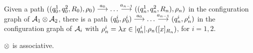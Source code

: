 \begin{corollary}
Given a path $((q_0^1,q_0^2,R_0),\rho_0) \overset{a_0}{\longrightarrow} \dots \overset{a_{n-1}}{\longrightarrow} ((q_n^1,q_n^2,R_n),\rho_n)$ in the configuration graph of $\mathcal{A}_1 \otimes \mathcal{A}_2$, there is a path $(q_0^i,\rho_0^i) \overset{a_0}{\longrightarrow} \dots \overset{a_{n-1}}{\longrightarrow} (q_n^i,\rho_n^i)$ in the configuration graph of $\mathcal{A}_i$ with $\rho_n^i = \lambda x \in |q_n^i|.\rho_n([x]_{R_n})$, for $i=1,2$.
\end{corollary}

\begin{proposition}
$\otimes$ is associative.
\end{proposition}

